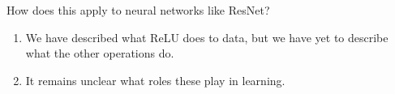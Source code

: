 \begin{question}
How does this apply to neural networks like ResNet?
\end{question}
\begin{enumerate}
\item We have described what ReLU does to data, but we have yet to describe what the other operations do.
\item It remains unclear what roles these play in learning.
\end{enumerate}






